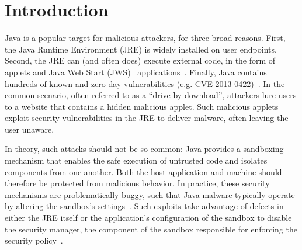 \documentclass{sig-alternate}
\begin{document}
\section{Introduction}

Java is a popular target for malicious attackers,
for three broad reasons.  First, the Java Runtime Environment (JRE) is widely installed on user endpoints.
Second, the JRE can (and often does) execute external code, in the form of
applets and Java Web Start (JWS)~\cite{_java_web_start}
applications~\cite{gong1997going,gong2003inside}.  Finally, Java contains
hundreds of known and zero-day vulnerabilities (e.g. CVE-2013-0422)~\cite{xforceQ12013}. In the
common scenario, often referred to as a ``drive-by download'', attackers lure
users to a website that contains a hidden malicious applet. Such malicious
applets exploit security vulnerabilities in the JRE to deliver malware,
often leaving the user unaware.

In theory, such attacks should not be so common: 
Java provides a sandboxing mechanism that enables the safe execution of untrusted code and isolates
components from one another. Both the host application and machine should
therefore be protected from malicious behavior.
In practice, these security mechanisms are problematically
buggy, such that Java malware typically operate by altering the sandbox's
settings~\cite{garber_2012}. Such exploits take advantage of defects in either
the JRE itself or the application's configuration of the sandbox to 
disable the security manager, the component of the sandbox responsible for enforcing the
security policy~\cite{fireeye_2013,svoboda_anatomy_blog_2013,security_explorations_2012,blackhat_2012}.
\end{document}
